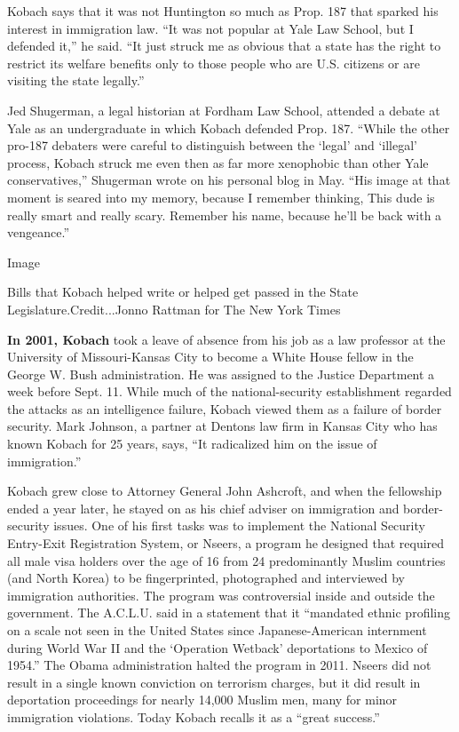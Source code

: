 Kobach says that it was not Huntington so much as Prop. 187 that sparked
his interest in immigration law. ``It was not popular at Yale Law
School, but I defended it,'' he said. ``It just struck me as obvious
that a state has the right to restrict its welfare benefits only to
those people who are U.S. citizens or are visiting the state legally.''

Jed Shugerman, a legal historian at Fordham Law School, attended a
debate at Yale as an undergraduate in which Kobach defended Prop. 187.
``While the other pro-187 debaters were careful to distinguish between
the `legal' and `illegal' process, Kobach struck me even then as far
more xenophobic than other Yale conservatives,'' Shugerman wrote on his
personal blog in May. ``His image at that moment is seared into my
memory, because I remember thinking, This dude is really smart and
really scary. Remember his name, because he'll be back with a
vengeance.''

Image

Bills that Kobach helped write or helped get passed in the State
Legislature.Credit...Jonno Rattman for The New York Times

\textbf{In 2001, Kobach} took a leave of absence from his job as a law
professor at the University of Missouri-Kansas City to become a White
House fellow in the George W. Bush administration. He was assigned to
the Justice Department a week before Sept. 11. While much of the
national-security establishment regarded the attacks as an intelligence
failure, Kobach viewed them as a failure of border security. Mark
Johnson, a partner at Dentons law firm in Kansas City who has known
Kobach for 25 years, says, ``It radicalized him on the issue of
immigration.''

Kobach grew close to Attorney General John Ashcroft, and when the
fellowship ended a year later, he stayed on as his chief adviser on
immigration and border-security issues. One of his first tasks was to
implement the National Security Entry-Exit Registration System, or
Nseers, a program he designed that required all male visa holders over
the age of 16 from 24 predominantly Muslim countries (and North Korea)
to be fingerprinted, photographed and interviewed by immigration
authorities. The program was controversial inside and outside the
government. The A.C.L.U. said in a statement that it ``mandated ethnic
profiling on a scale not seen in the United States since
Japanese-American internment during World War II and the `Operation
Wetback' deportations to Mexico of 1954.'' The Obama administration
halted the program in 2011. Nseers did not result in a single known
conviction on terrorism charges, but it did result in deportation
proceedings for nearly 14,000 Muslim men, many for minor immigration
violations. Today Kobach recalls it as a ``great success.''


